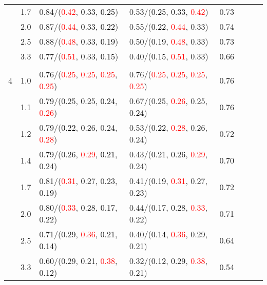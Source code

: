 \documentclass[10pt,a4paper]{report}
\begin{document}
\begin{table}[!htbp]
\begin{center}
{\begin{tabular}{ccllcccc}
			&1.7&0.84/(\textcolor{red}{0.42}, 0.33, \textcolor{black}{0.25})&0.53/(\textcolor{black}{0.25}, 0.33, \textcolor{red}{0.42})&0.73\\
			&2.0&0.87/(\textcolor{red}{0.44}, 0.33, \textcolor{black}{0.22})&0.55/(\textcolor{black}{0.22}, \textcolor{red}{0.44}, 0.33)&0.74\\
			&2.5&0.88/(\textcolor{red}{0.48}, 0.33, \textcolor{black}{0.19})&0.50/(\textcolor{black}{0.19}, \textcolor{red}{0.48}, 0.33)&0.73\\
			&3.3&0.77/(\textcolor{red}{0.51}, 0.33, \textcolor{black}{0.15})&0.40/(\textcolor{black}{0.15}, \textcolor{red}{0.51}, 0.33)&0.66\\
			&&&&\\
			4			&1.0&0.76/(\textcolor{red}{0.25}, \textcolor{red}{0.25}, \textcolor{red}{0.25}, \textcolor{red}{0.25})&0.76/(\textcolor{red}{0.25}, \textcolor{red}{0.25}, \textcolor{red}{0.25}, \textcolor{red}{0.25})&0.76\\
			&1.1&0.79/(0.25, 0.25, \textcolor{black}{0.24}, \textcolor{red}{0.26})&0.67/(0.25, \textcolor{red}{0.26}, 0.25, \textcolor{black}{0.24})&0.76\\
			&1.2&0.79/(\textcolor{black}{0.22}, 0.26, 0.24, \textcolor{red}{0.28})&0.53/(\textcolor{black}{0.22}, \textcolor{red}{0.28}, 0.26, 0.24)&0.72\\
			&1.4&0.79/(0.26, \textcolor{red}{0.29}, \textcolor{black}{0.21}, 0.24)&0.43/(\textcolor{black}{0.21}, 0.26, \textcolor{red}{0.29}, 0.24)&0.70\\
			&1.7&0.81/(\textcolor{red}{0.31}, 0.27, 0.23, \textcolor{black}{0.19})&0.41/(\textcolor{black}{0.19}, \textcolor{red}{0.31}, 0.27, 0.23)&0.72\\
			&2.0&0.80/(\textcolor{red}{0.33}, 0.28, \textcolor{black}{0.17}, 0.22)&0.44/(\textcolor{black}{0.17}, 0.28, \textcolor{red}{0.33}, 0.22)&0.71\\
			&2.5&0.71/(0.29, \textcolor{red}{0.36}, 0.21, \textcolor{black}{0.14})&0.40/(\textcolor{black}{0.14}, \textcolor{red}{0.36}, 0.29, 0.21)&0.64\\
			&3.3&0.60/(0.29, 0.21, \textcolor{red}{0.38}, \textcolor{black}{0.12})&0.32/(\textcolor{black}{0.12}, 0.29, \textcolor{red}{0.38}, 0.21)&0.54\\
			\bottomrule
		\end{tabular}}
	\end{center}
\end{table}
\end{document}
